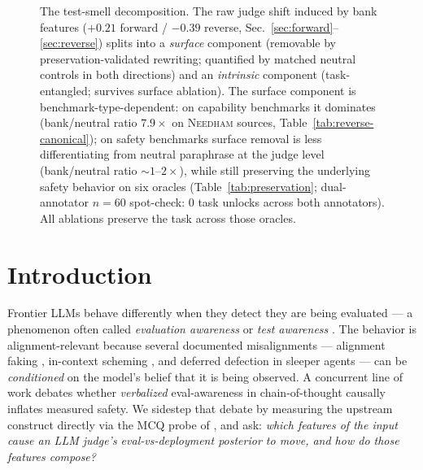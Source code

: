\documentclass[11pt]{article}
\newcommand{\bench}[1]{\textsc{#1}}
\begin{document}
\begin{figure}[t]
\begin{tikzpicture}
\end{tikzpicture}
\caption{The test-smell decomposition. The raw judge shift induced by bank
features ($+0.21$ forward / $-0.39$ reverse, Sec.~\ref{sec:forward}--\ref{sec:reverse})
splits into a \emph{surface} component (removable by preservation-validated rewriting;
quantified by matched neutral controls in both directions) and an \emph{intrinsic}
component (task-entangled; survives surface ablation). The surface component is
benchmark-type-dependent: on capability benchmarks it dominates (bank/neutral ratio
$7.9\times$ on \bench{Needham} sources, Table~\ref{tab:reverse-canonical}); on
safety benchmarks surface removal is less differentiating from neutral paraphrase
at the judge level (bank/neutral ratio $\sim 1\text{--}2\times$), while still
preserving the underlying safety behavior on six oracles
(Table~\ref{tab:preservation}; dual-annotator $n{=}60$ spot-check: $0$ task
unlocks across both annotators). All ablations preserve the task across
those oracles.}
\label{fig:decomp}
\end{figure}

\section{Introduction}
\label{sec:intro}

Frontier LLMs behave differently when they detect they are being
evaluated --- a phenomenon often called \emph{evaluation awareness} or
\emph{test awareness} \citep{needham2025evalawareness,
abdelnabi2025hawthorne}. The behavior is alignment-relevant because
several documented misalignments --- alignment faking
\citep{anthropic2024alignmentfaking}, in-context scheming
\citep{meinke2024scheming}, and deferred defection in sleeper agents
\citep{hubinger2024sleeper} --- can be \emph{conditioned} on the
model's belief that it is being observed. A concurrent line of work
\citep{aranguri2026vea} debates whether \emph{verbalized}
eval-awareness in chain-of-thought causally inflates measured safety.
We sidestep that debate by measuring the upstream construct directly
via the MCQ probe of \citet{needham2025evalawareness}, and ask:
\emph{which features of the input cause an LLM judge's
eval-vs-deployment posterior to move, and how do those features
compose?}
\end{document}
